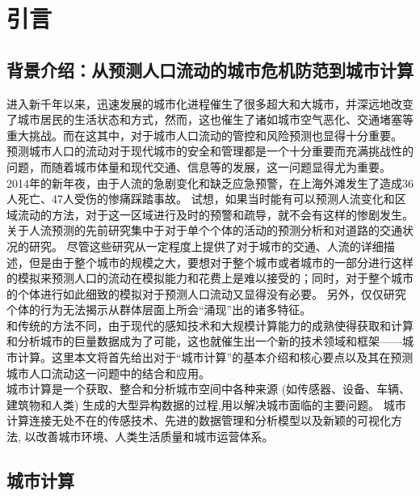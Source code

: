
\chapter{引言} %
\label{Chapter1} %
\section{背景介绍：从预测人口流动的城市危机防范到城市计算}
进入新千年以来，迅速发展的城市化进程催生了很多超大和大城市，并深远地改变了城市居民的生活状态和方式，然而，这也催生了诸如城市空气恶化、交通堵塞等重大挑战。而在这其中，对于城市人口流动的管控和风险预测也显得十分重要。
预测城市人口的流动对于现代城市的安全和管理都是一个十分重要而充满挑战性的问题，而随着城市体量和现代交通、信息等的发展，这一问题显得尤为重要。 2014年的新年夜，由于人流的急剧变化和缺乏应急预警，在上海外滩发生了造成36人死亡、47人受伤的惨痛踩踏事故\cite{hoang2016fccf:}。 试想，如果当时能有可以预测人流变化和区域流动的方法，对于这一区域进行及时的预警和疏导，就不会有这样的惨剧发生。\\
关于人流预测的先前研究集中于对于单个个体的活动的预测分析\cite{ye2009mining,zheng2012an}和对道路的交通状况的研究\cite{shang2014inferring,wang2014travel}。 尽管这些研究从一定程度上提供了对于城市的交通、人流的详细描述，但是由于整个城市的规模之大，要想对于整个城市或者城市的一部分进行这样的模拟来预测人口的流动在模拟能力和花费上是难以接受的；同时，对于整个城市的个体进行如此细致的模拟对于预测人口流动又显得没有必要。 另外，仅仅研究个体的行为无法揭示从群体层面上所会“涌现”出的诸多特征。\\
和传统的方法不同，由于现代的感知技术和大规模计算能力的成熟使得获取和计算和分析城市的巨量数据成为了可能，这也就催生出一个新的技术领域和框架——城市计算。这里本文将首先给出对于“城市计算”的基本介绍和核心要点以及其在预测城市人口流动这一问题中的结合和应用。\\
城市计算是一个获取、整合和分析城市空间中各种来源 (如传感器、设备、车辆、建筑物和人类) 生成的大型异构数据的过程,用以解决城市面临的主要问题\cite{zheng2014urban}。 城市计算连接无处不在的传感技术、先进的数据管理和分析模型以及新颖的可视化方法, 以改善城市环境、人类生活质量和城市运营体系。
\section{城市计算}
